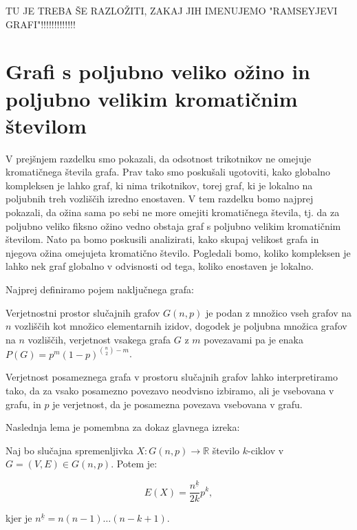 \documentclass[mat1, tisk]{fmfdelo}
\begin{document}
TU JE TREBA ŠE RAZLOŽITI, ZAKAJ JIH IMENUJEMO "RAMSEYJEVI GRAFI"!!!!!!!!!!!!!

\section{Grafi s poljubno veliko ožino in poljubno velikim kromatičnim številom}
V prejšnjem razdelku smo pokazali, da odsotnost trikotnikov ne omejuje kromatičnega števila grafa. Prav tako smo poskušali ugotoviti, kako globalno kompleksen je lahko graf, ki nima trikotnikov, torej graf,
ki je lokalno na poljubnih treh vozliščih izredno enostaven. V tem razdelku bomo najprej pokazali, da ožina sama po sebi ne more omejiti kromatičnega števila, tj. da za poljubno veliko fiksno ožino vedno obstaja
graf s poljubno velikim kromatičnim številom. Nato pa bomo poskusili analizirati, kako skupaj velikost grafa in njegova ožina omejujeta kromatično število. Pogledali bomo, koliko kompleksen je lahko nek graf globalno 
v odvisnosti od tega, koliko enostaven je lokalno.

Najprej definiramo pojem naključnega grafa:

    \begin{definicija}
        Verjetnostni prostor slučajnih grafov $G(n, p)$ je podan z množico vseh grafov na $n$ vozliščih kot množico elementarnih izidov, dogodek je poljubna množica grafov na $n$ vozliščih, verjetnost vsakega grafa $G$
        z $m$ povezavami pa je enaka $P(G) = p^m(1 - p)^{\binom{n}{2}-m}$.
    \end{definicija}

    \begin{opomba}
        Verjetnost posameznega grafa v prostoru slučajnih grafov lahko interpretiramo tako, da za vsako posamezno povezavo neodvisno izbiramo, ali je vsebovana v grafu, in $p$ je verjetnost, da je posamezna povezava vsebovana v grafu.
    \end{opomba}

Naslednja lema je pomembna za dokaz glavnega izreka:

    \begin{lema}
        Naj bo slučajna spremenljivka $X : G(n, p) \to \mathbb{R}$ število $k$-ciklov v $G = (V, E) \in G(n, p)$. Potem je:

        $$E(X) = \frac{n^{\underline{k}}}{2k}p^k,$$

        kjer je $n^{\underline{k}} = n(n-1)\ldots(n-k+1)$.
    \end{lema}
\end{document}
